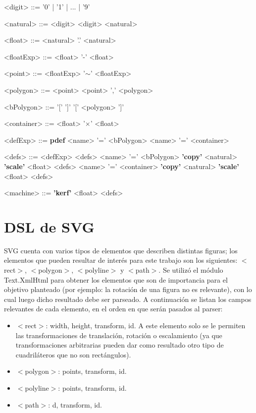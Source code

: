 \documentclass[a4paper,10pt]{article}
\begin{document}
\begin{grammar}
<digit> ::= '0' | '1' | ... | '9'

<natural> ::= <digit>
    \alt <digit> <natural>

<float> ::= <natural> '.' <natural>

<floatExp> ::= <float>
    \alt '-' <float>

<point> ::= <floatExp> '$\sim$' <floatExp>

<polygon> ::= <point>
    \alt <point> ',' <polygon>

<bPolygon> ::= '[' ']'
    \alt '[' <polygon> ']'

<container> ::= <float> '$\times$' <float>

<defExp> ::= {\bfseries pdef} <name> '=' <bPolygon>
     <name> '=' <container>

<defs> ::= <defExp> <defs>
     <name> '=' <bPolygon> {\bfseries 'copy'} <natural> {\bfseries 'scale'} <float> <defs>
     <name> '=' <container> {\bfseries 'copy'} <natural> {\bfseries 'scale'} <float> <defs>
    \alt

<machine> ::= {\bfseries 'kerf'} <float> <defs>
\end{grammar}

\normalfont

\section*{DSL de SVG}

    SVG cuenta con varios tipos de elementos que describen distintas figuras; los elementos que pueden
    resultar de interés para este trabajo son los siguientes: $<$rect$>$, $<$polygon$>$, $<$polyline$>$ y
    $<$path$>$. Se utilizó el módulo Text.XmlHtml para obtener los elementos que son de importancia para
    el objetivo planteado (por ejemplo: la rotación de una figura no es relevante), con lo cual luego dicho
    resultado debe ser parseado. A continuación se listan los campos relevantes de cada elemento, en el orden
    en que serán pasados al parser:

    \begin{itemize}
        \item $<$rect$>$: width, height, transform,  id. A este elemento solo se le permiten las
        transformaciones de translación, rotación o escalamiento (ya que transformaciones arbitrarias pueden
        dar como resultado otro tipo de cuadriláteros que no son rectángulos).
        \item $<$polygon$>$: points, transform,  id.
        \item $<$polyline$>$: points, transform,  id.
        \item $<$path$>$: d, transform,  id.
    \end{itemize}
\end{document}
